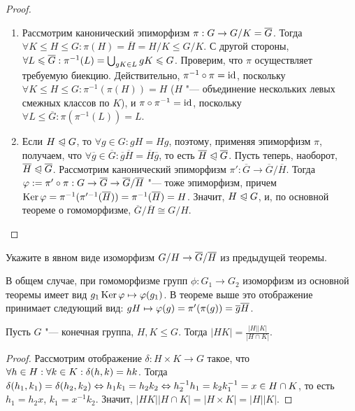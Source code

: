 \begin{proof}~
	\begin{enumerate}
		\item Рассмотрим канонический эпиморфизм $\pi: G \hm\to G / K = \overline{G}$. Тогда $\forall K \le H \le G: \pi(H) =\overline{H} = H / K \le G / K$. С другой стороны, $\forall L \le \overline{G}: \pi^{-1}(L) = \bigcup_{gK \in L}gK \hm\le G$. Проверим, что $\pi$ осуществляет требуемую биекцию. Действительно, $\pi^{-1}\circ\pi \hm= \id$, поскольку $\forall K \le H \le G: \pi^{-1}(\pi(H)) = H$ ($H$ "--- объединение нескольких левых смежных классов по $K$), и $\pi\circ\pi^{-1} = \operatorname{id}$, поскольку $\forall L \le \overline{G}: \pi(\pi^{-1}(L)) = L$.
		
		\item Если $H \trianglelefteqslant G$, то $\forall g \in G: gH = Hg$, поэтому, применяя эпиморфизм $\pi$, получаем, что $\forall \overline{g} \in \overline{G}: \overline{g}\overline{H} = \overline{H}\overline{g}$, то есть $\overline{H} \trianglelefteqslant \overline{G}$. Пусть теперь, наоборот, $\overline{H} \trianglelefteqslant \overline{G}$. Рассмотрим канонический эпиморфизм $\pi': \overline{G} \to \overline{G} / \overline{H}$. Тогда $\phi := \pi'\circ\pi: G \hm\to \overline{G} \hm\to \overline{G} / \overline{H}$ "--- тоже эпиморфизм, причем $\ke\phi = \pi^{-1}(\pi'^{-1}(\overline{H})) \hm= \pi^{-1}(\overline{H}) = H$. Значит, $H \trianglelefteqslant G$, и, по основной теореме о гомоморфизме, $\overline{G} / \overline{H} \cong G / H$.
	\end{enumerate}
\end{proof}

\begin{exercise}
	Укажите в явном виде изоморфизм $G / H \hm\to \overline{G} / \overline{H}$ из предыдущей теоремы.
\end{exercise}

\begin{solution}
	В общем случае, при гомоморфизме групп $\phi: G_1 \to G_2$ изоморфизм из основной теоремы имеет вид $g_1\operatorname{Ker}\varphi \mapsto \varphi(g_1)$. В теореме выше это отображение принимает следующий вид: $gH \hm\mapsto \phi(g) = \pi'(\pi(g)) = \overline{g}\overline{H}$.
\end{solution}

\begin{proposition}
	Пусть $G$ "--- конечная группа, $H, K \le G$. Тогда $|HK| = \frac{|H||K|}{|H\cap K|}$.
\end{proposition}

\begin{proof}
	Рассмотрим отображение $\delta: H\times K \to G$ такое, что $\forall h \hm\in H: \forall k \in K: \delta(h, k) = hk$. Тогда $\delta(h_1, k_1) = \delta(h_2, k_2) \hm\Leftrightarrow h_1k_1 = h_2k_2 \hm\Leftrightarrow h_2^{-1}h_1 = k_2k_1^{-1} = x \in H \cap K$, то есть $h_1 = h_2x$, $k_1 = x^{-1}k_2$. Значит, $|HK||H \cap K| = |H \times K| = |H||K|$.
\end{proof}

